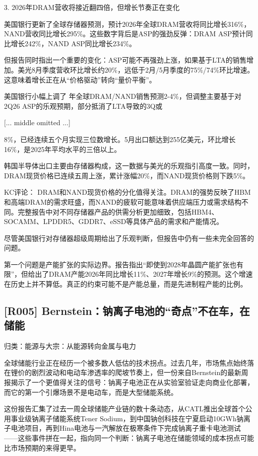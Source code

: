 \documentclass[11pt]{ctexart}
\begin{document}
3. 2026年DRAM营收将接近翻四倍，但增长节奏正在变化

美国银行更新了全球存储器预测，预计2026年全球DRAM营收将同比增长316\%，NAND营收同比增长295\%。这些数字背后是ASP的强劲反弹：DRAM ASP预计同比增长242\%，NAND ASP同比增长234\%。

但报告同时指出一个重要的变化：ASP可能不再强劲上涨，如果基于LTA的销售增加。美光8月季度营收环比增长约20\%，远低于2月/5月季度的75\%/74\%环比增速。这意味着增长正在从“价格驱动”转向“量价平衡”。

美国银行小幅上调了 年全球DRAM/NAND销售预测2-4\%，但调整主要基于对2Q26 ASP的乐观预期，部分抵消了LTA导致的3Q或

[... middle omitted ...]

8\%，已经连续五个月实现三位数增长。5月出口额达到255亿美元，环比增长16\%，是2025年平均水平的三倍以上。

韩国半导体出口主要由存储器构成，这一数据与美光的乐观指引高度一致。同时，DRAM现货价格已连续五周上涨，累计涨幅20\%，而NAND现货价格则下跌5\%。

KC评论： DRAM和NAND现货价格的分化值得关注。DRAM的强势反映了HBM和高端DRAM的需求旺盛，而NAND的疲软可能意味着供应端压力或需求结构不同。完整报告中对不同存储器产品的供需分析更加细致，包括HBM4、SOCAMM、LPDDR5、GDDR7、eSSD等具体产品的需求和产能情况。

尽管美国银行对存储器超级周期给出了乐观判断，但报告中仍有一些未完全回答的问题。

第一个问题是产能扩张的实际边界。报告指出“即使到2028年晶圆产能扩张也有限”，但给出了DRAM产能2026年同比增长11\%、2027年增长9\%的预测。这个增速在历史上并不算低。真正的约束可能不是产能总量，而是先进制程产能的比例。

\subsection{[R005] Bernstein：钠离子电池的“奇点”不在车，在储能}
{\small\color{refgray}归类：能源与大宗：从能源转向金属与电力}

全球储能行业正在经历一个被多数人低估的技术拐点。过去几年，市场焦点始终落在锂价的剧烈波动和电动车渗透率的爬坡节奏上，但一份来自Bernstein的最新周报揭示了一个更值得关注的信号：钠离子电池正在从实验室验证走向商业化部署，而它的第一个引爆场景不是电动车，而是大型储能系统。

这份报告汇集了过去一周全球储能产业链的数十条动态，从CATL推出全球首个公用事业级钠离子储能系统Tener Sodium，到中国钠创科技在宁夏启动10GWh钠离子电池项目，再到Hina电池与一汽解放在极寒条件下完成钠离子重卡电池测试——这些事件拼在一起，指向同一个判断：钠离子电池在储能领域的成本拐点可能比市场预期的来得更早。
\end{document}
